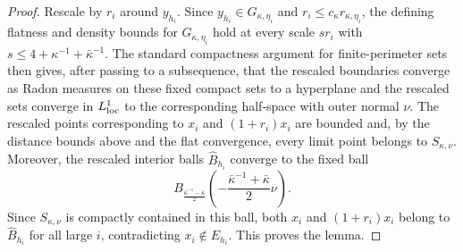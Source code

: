 \documentclass[reqno,11pt]{amsart}
\numberwithin{equation}{section}
\theoremstyle{remark}
\begin{document}
{\begin{proof}
Rescale by $r_i$ around $y_{h_i}$. Since $y_{h_i}\in G_{\kappa,\eta_i}$ and
$r_i\le c_\kappa r_{\kappa,\eta_i}$, the defining flatness and density bounds for $G_{\kappa,\eta_i}$ hold at every scale
$s r_i$ with $s\le 4+\kappa^{-1}+\bar\kappa^{-1}$. The standard compactness argument for finite-perimeter sets then gives,
after passing to a subsequence, that the rescaled boundaries converge as Radon measures on these fixed compact sets to a
hyperplane and the rescaled sets converge in
$L^1_{\rm loc}$ to the corresponding half-space with outer normal $\nu$. The rescaled points corresponding to $x_i$ and
$(1+r_i)x_i$ are bounded and, by the distance bounds above and the flat convergence, every limit point
belongs to $S_{\kappa,\nu}$. Moreover, the rescaled interior balls
$\widehat B_{h_i}$ converge to the fixed ball
\[
B_{\frac{\bar\kappa^{-1}-\bar\kappa}{2}}\!\left(-\frac{\bar\kappa^{-1}+\bar\kappa}{2}\nu\right).
\]
Since $S_{\kappa,\nu}$ is compactly contained in this ball, both $x_i$ and $(1+r_i)x_i$ belong to $\widehat B_{h_i}$ for
all large $i$, contradicting
$x_i\notin E_{h_i}$. This proves the lemma.
\end{proof}
}
\end{document}
